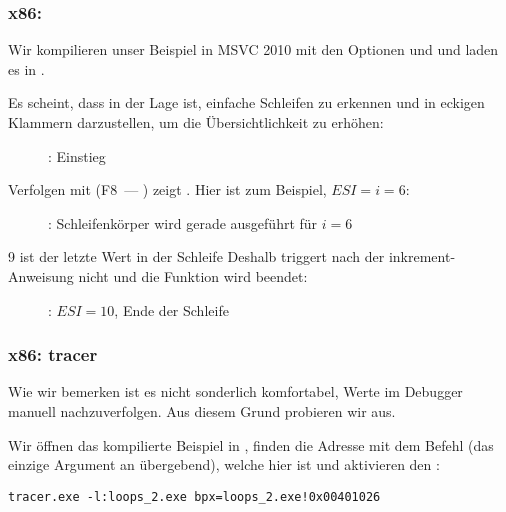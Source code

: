 \clearpage
\subsubsection{x86: \olly}
\myindex{\olly}

Wir kompilieren unser Beispiel in MSVC 2010 mit den Optionen \Ox und \Obzero und
laden es in \olly.

Es scheint, dass \olly in der Lage ist, einfache Schleifen zu erkennen und in
eckigen Klammern darzustellen, um die Übersichtlichkeit zu erhöhen:

\begin{figure}[H]
\centering
{}
\caption{\olly: \main Einstieg}
\label{fig:loops_olly_1}
\end{figure}

Verfolgen mit (F8~--- \stepover) zeigt \ESI 
{}.
Hier ist zum Beispiel, $ESI=i=6$:

\begin{figure}[H]
\centering
{}
\caption{\olly: Schleifenkörper wird gerade ausgeführt für $i=6$}
\label{fig:loops_olly_2}
\end{figure}

9 ist der letzte Wert in der Schleife
Deshalb triggert \JL nach der \gls{inkrement}-Anweisung nicht und die Funktion
wird beendet:

\begin{figure}[H]
\centering
{}
\caption{\olly: $ESI=10$, Ende der Schleife}
\label{fig:loops_olly_3}
\end{figure}

\subsubsection{x86: tracer}

Wie wir bemerken ist es nicht sonderlich komfortabel, Werte im Debugger manuell
nachzuverfolgen. Aus diesem Grund probieren wir \tracer aus.

Wir öffnen das kompilierte Beispiel in \IDA, finden die Adresse mit dem Befehl
 (das einzige Argument an \ttf übergebend), welche hier
 ist und aktivieren den \tracer:


\begin{lstlisting}
tracer.exe -l:loops_2.exe bpx=loops_2.exe!0x00401026
\end{lstlisting}

